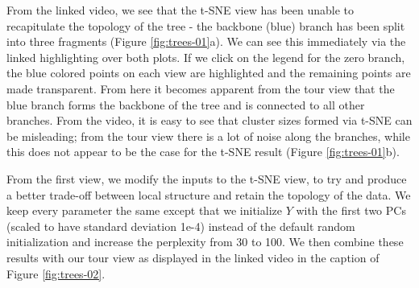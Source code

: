 \documentclass[article,notitle]{jdssv}
\begin{document}
From the linked video, we see that the t-SNE view has been unable to
recapitulate the topology of the tree - the backbone (blue) branch has been
split into three fragments (Figure \ref{fig:trees-01}a). We can see
this immediately via the linked highlighting over both
plots. If we click on the legend for the zero branch, the blue colored points
on each view are highlighted and the remaining points are made transparent.
From here it becomes apparent from the tour view that the blue branch forms
the backbone of the tree and is connected to all other branches. From the video,
it is easy to see that cluster sizes formed via t-SNE can be misleading; from the tour
view there is a lot of noise along the branches, while this does not appear to
be the case for the t-SNE result (Figure \ref{fig:trees-01}b).

From the first view, we modify the inputs to the t-SNE view, to try and produce
a better trade-off between local structure and retain the topology of the data.
We keep every parameter the same except that we initialize \(Y\) with the first
two PCs (scaled to have standard deviation 1e-4) instead of the default random
initialization and increase the perplexity from 30 to 100. We then combine
these results with our tour view as displayed in the linked video in the caption
of Figure \ref{fig:trees-02}.
\end{document}
